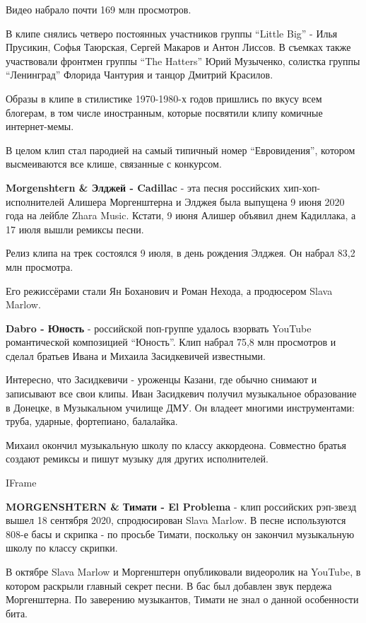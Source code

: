 Видео набрало почти 169 млн просмотров. 

В клипе снялись четверо постоянных участников группы \enquote{Little Big} - Илья
Прусикин, Софья Таюрская, Сергей Макаров и Антон Лиссов. В съемках также
участвовали фронтмен группы \enquote{The Hatters} Юрий Музыченко, солистка группы
\enquote{Ленинград} Флорида Чантурия и танцор Дмитрий Красилов.

Образы в клипе в стилистике 1970-1980-х годов пришлись по вкусу всем
блогерам, в том числе иностранным, которые посвятили клипу комичные
интернет-мемы.

В целом клип стал пародией на самый типичный номер \enquote{Евровидения},  котором
высмеиваются все клише, связанные с конкурсом.

\textbf{Morgenshtern \& Элджей - Cadillac} - эта песня российских
хип-хоп-исполнителей Алишера Моргенштерна и Элджея была выпущена 9 июня
2020 года на лейбле Zhara Music. Кстати, 9 июня Алишер объявил днем
Кадиллака, а 17 июля вышли ремиксы песни.

Релиз клипа на трек состоялся 9 июля, в день рождения Элджея. Он набрал
83,2 млн просмотра. 

Его режиссёрами стали Ян Боханович и Роман Нехода, а продюсером Slava
Marlow.

\textbf{Dabro - Юность} - российской поп-группе удалось взорвать YouTube
романтической композицией \enquote{Юность}. Клип набрал 75,8 млн просмотров и
сделал братьев Ивана и Михаила Засидкевичей известными.

Интересно, что Засидкевичи - уроженцы Казани, где обычно снимают и
записывают все свои клипы. Иван Засидкевич получил музыкальное образование
в Донецке, в Музыкальном училище ДМУ. Он владеет многими инструментами:
труба, ударные, фортепиано, балалайка.

Михаил окончил музыкальную школу по классу аккордеона. Совместно братья
создают ремиксы и пишут музыку для других исполнителей.

IFrame

\textbf{MORGENSHTERN \& Тимати - El Problema} - клип российских рэп-звезд вышел 18
сентября 2020, спродюсирован Slava Marlow. В песне используются 808-е басы
и скрипка - по просьбе Тимати, поскольку он закончил музыкальную школу по
классу скрипки.

В октябре Slava Marlow и Моргенштерн опубликовали видеоролик на YouTube, в
котором раскрыли главный секрет песни. В бас был добавлен звук пердежа
Моргенштерна. По заверению музыкантов, Тимати не знал о данной особенности
бита. 

